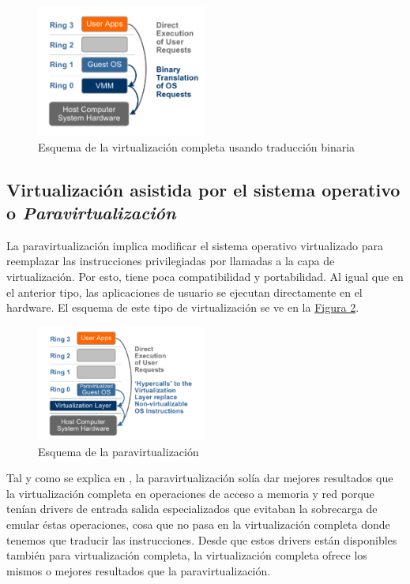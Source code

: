 \documentclass[10pt,a4paper,spanish]{article}
\numberwithin{equation}{section} %
\numberwithin{figure}{section} %
\numberwithin{table}{section} %
\begin{document}
\begin{figure}[!h]
\centering
\includegraphics[width=0.5\textwidth]{1}
\caption{Esquema de la virtualización completa usando traducción binaria}
\label{full_vir}
\end{figure}

\subsection{Virtualización asistida por el sistema operativo o \textit{Paravirtualización}}
La paravirtualización implica modificar el sistema operativo virtualizado para reemplazar las instrucciones privilegiadas por llamadas a la capa de virtualización. Por esto, tiene poca compatibilidad y portabilidad. Al igual que en el anterior tipo, las aplicaciones de usuario se ejecutan directamente en el hardware. El esquema de este tipo de virtualización se ve en la \hyperref[paravir]{Figura \ref*{paravir}}.

\begin{figure}[!h]
\centering
\includegraphics[width=0.5\textwidth]{2}
\caption{Esquema de la paravirtualización}
\label{paravir}
\end{figure}

Tal y como se explica en \cite{amazon}, la paravirtualización solía dar mejores resultados que la virtualización completa en operaciones de acceso a memoria y red porque tenían drivers de entrada salida especializados que evitaban la sobrecarga de emular éstas operaciones, cosa que no pasa en la virtualización completa donde tenemos que traducir las instrucciones. Desde que estos drivers están disponibles también para virtualización completa, la virtualización completa ofrece los mismos o mejores resultados que la paravirtualización.
\end{document}
